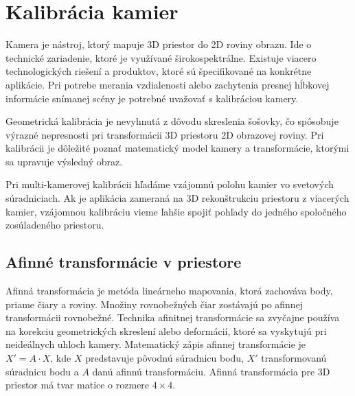 \chapter{Kalibrácia kamier} 
\label{kap:kalibracia}
\pagestyle{fancy}
\fancyhf{}
\fancyfoot[CE,CO]{\thepage}
\renewcommand{\footrulewidth}{1pt}


Kamera je nástroj, ktorý mapuje 3D priestor do 2D roviny obrazu. Ide o technické zariadenie, ktoré je využívané širokospektrálne. Existuje viacero technologických riešení a produktov, ktoré sú špecifikované na konkrétne aplikácie. Pri potrebe merania vzdialenosti alebo zachytenia presnej hĺbkovej informácie snímanej scény je potrebné uvažovať s kalibráciou kamery. 

Geometrická kalibrácia je nevyhnutá z dôvodu skreslenia šošovky, čo spôsobuje výrazné nepresnosti pri transformácii 3D priestoru 2D obrazovej roviny. Pri kalibrácii je dôležité poznať matematický model kamery a transformácie, ktorými sa upravuje výsledný obraz. 

Pri multi-kamerovej kalibrácii hľadáme vzájomnú polohu kamier vo svetových súradniciach. Ak je aplikácia zameraná na 3D rekonštrukciu priestoru z viacerých kamier, vzájomnou kalibráciu vieme ľahšie spojiť pohľady do jedného spoločného zosúladeného priestoru. 


\section{Afinné transformácie v priestore}
\label{sec:afine}


Afinná transformácia je metóda lineárneho mapovania, ktorá zachováva body, priame čiary a roviny. Množiny rovnobežných čiar zostávajú po afinnej transformácii rovnobežné. Technika afinitnej transformácie sa zvyčajne používa na korekciu geometrických skreslení alebo deformácií, ktoré sa vyskytujú pri neideálnych uhloch kamery. Matematický zápis afinnej transformácie je $X'=A\cdot X$, kde $X$ predstavuje pôvodnú súradnicu bodu, $X'$ transformovanú súradnicu bodu a $A$ danú afinnú transformáciu. Afinná transformácia pre 3D priestor má tvar matice o rozmere $4\times 4$.\newline

